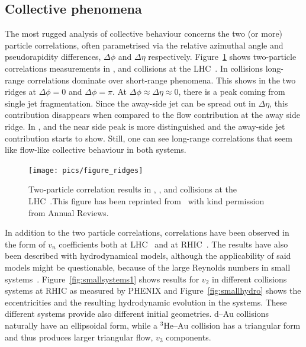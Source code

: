 
\subsection{Collective phenomena}
The most rugged analysis of collective behaviour concerns the two (or more) particle correlations, often parametrised via the relative azimuthal angle and pseudorapidity differences, $\Delta \phi$ and $\Delta \eta$ respectively. Figure~\ref{fig:smallsystems2} shows two-particle correlations measurements in \PbPb, \pPb and \pp collisions at the LHC~\cite{Aad:2015gqa}. In \PbPb collisions long-range correlations dominate over short-range phenomena. This shows in the two ridges at $\Delta \phi = 0 $ and $\Delta \phi = \pi$. At $\Delta\phi\approx\Delta\eta\approx0$, there is a peak coming from single jet fragmentation. Since the away-side jet can be spread out in $\Delta\eta$, this contribution disappears when compared to the flow contribution at the away side ridge. In \pPb, and \pp the near side peak is more distinguished and the away-side jet contribution starts to show. Still, one can see long-range correlations that seem like flow-like collective behaviour in both systems. 
\begin{figure}[b!]
\centering
            	\texttt{[image: pics/figure\_ridges]}
                \caption{Two-particle correlation results in \PbPb, \pPb, and \pp collisions at the LHC~\cite{Aad:2015gqa}.This figure has been reprinted from~\cite{Nagle:2018nvi} with kind permission from Annual Reviews. }
	\label{fig:smallsystems2}
\end{figure}

In addition to the two particle correlations, correlations have been observed in the form of $v_n$ coefficients both at LHC~\cite{Acharya:2017ino} and at RHIC~\cite{Aidala:2016vgl}. The results have also been described  with hydrodynamical models, although the applicability of said models might be questionable, because of the large Reynolds numbers in small systems~\cite{Shen:2016zpp,Niemi:2014wta}. Figure~\ref{fig:smallsystems1} shows results for $v_2$ in different collisions systems at RHIC as measured by PHENIX and Figure~\ref{fig:smallhydro} shows the eccentricities and the resulting hydrodynamic evolution in the systems. These different systems provide also different initial geometries. d--Au collisions naturally have an ellipsoidal form, while a $^3\mbox{He--Au}$ collision has a triangular form and thus produces larger triangular flow, $v_3$ components. 

